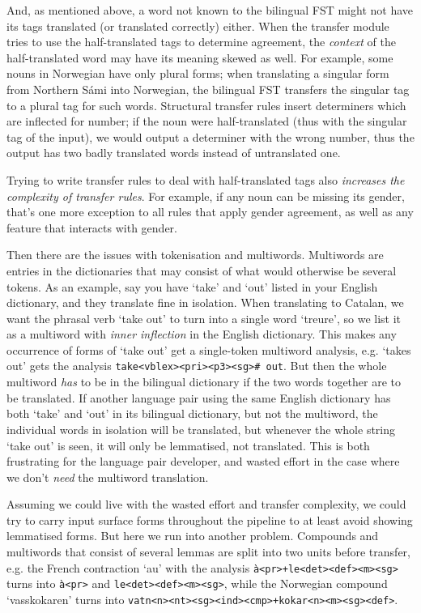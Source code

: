 \documentclass[10pt, a4paper]{article}
\newcommand{\ana}[1]{\texttt{#1}}
\newcommand{\f}[1]{`#1'}
\begin{document}
And, as mentioned above, a word not known to the bilingual FST might
not have its tags translated (or translated correctly) either. When
the transfer module tries to use the half-translated tags to determine
agreement, the \emph{context} of the half-translated word may have its
meaning skewed as well. For example, some nouns in Norwegian have only
plural forms; when translating a singular form from Northern Sámi into
Norwegian, the bilingual FST transfers the singular tag to a plural
tag for such words. Structural transfer rules insert determiners which
are inflected for number; if the noun were half-translated (thus with
the singular tag of the input), we would output a determiner with the
wrong number, thus the output has two badly translated words instead
of untranslated one.

Trying to write transfer rules to deal with half-translated tags also
\emph{increases the complexity of transfer rules}. For example, if any
noun can be missing its gender, that's one more exception to all rules
that apply gender agreement, as well as any feature that interacts
with gender.

Then there are the issues with tokenisation and multiwords. Multiwords
are entries in the dictionaries that may consist of what would
otherwise be several tokens. As an example, say you have \f{take} and
\f{out} listed in your English dictionary, and they translate fine in
isolation. When translating to Catalan, we want the phrasal verb
\f{take out} to turn into a single word \f{treure}, so we list it as a
multiword with \emph{inner inflection} in the English dictionary. This
makes any occurrence of forms of \f{take out} get a single-token
multiword analysis, e.g. \f{takes out} gets the analysis
\ana{take<vblex><pri><p3><sg>\# out}. But then the whole multiword
\emph{has} to be in the bilingual dictionary if the two words together
are to be translated. If another language pair using the same English
dictionary has both \f{take} and \f{out} in its bilingual dictionary,
but not the multiword, the individual words in isolation will be
translated, but whenever the whole string \f{take out} is seen, it
will only be lemmatised, not translated. This is both frustrating for
the language pair developer, and wasted effort in the case where we
don't \emph{need} the multiword translation.

Assuming we could live with the wasted effort and transfer complexity,
we could try to carry input surface forms throughout the pipeline to
at least avoid showing lemmatised forms. But here we run into another
problem. Compounds and multiwords that consist of several lemmas are
split into two units before transfer, e.g. the French contraction
\f{au} with the analysis \ana{à<pr>+le<det><def><m><sg>} turns into
\ana{à<pr>} and \ana{le<det><def><m><sg>}, while the Norwegian
compound \f{vasskokaren} turns into
\ana{vatn<n><nt><sg><ind><cmp>+kokar<n><m><sg><def>}.
\end{document}
